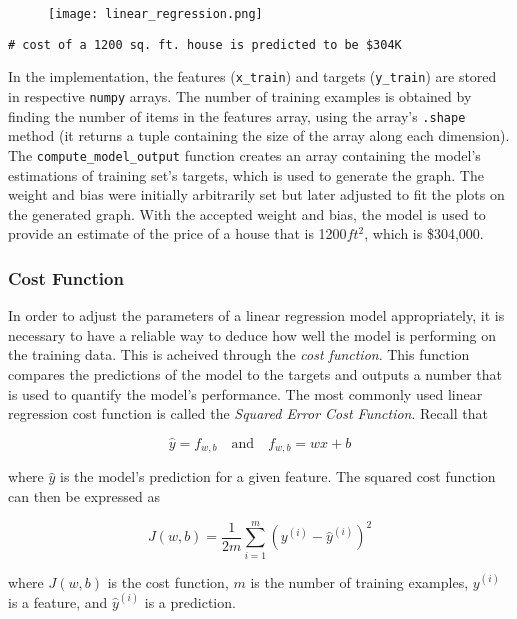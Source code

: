 \documentclass{article}
\begin{document}
\begin{figure}
\centering
\texttt{[image: linear\_regression.png]}
\end{figure}

\begin{lstlisting}[caption={Code Output}]
# cost of a 1200 sq. ft. house is predicted to be $304K
\end{lstlisting}

\noindent In the implementation, the features (\texttt{x\_train}) and targets (\texttt{y\_train}) are stored in respective \texttt{numpy} arrays. The number of training examples is obtained by finding the number of items in the features array, using the array's \texttt{.shape} method (it returns a tuple containing the size of the array along each dimension). The \texttt{compute\_model\_output} function creates an array containing the model's estimations of training set's targets, which is used to generate the graph. The weight and bias were initially arbitrarily set but later adjusted to fit the plots on the generated graph. With the accepted weight and bias, the model is used to provide an estimate of the price of a house that is 1200$ft^2$, which is \$304,000.

\subsubsection{Cost Function}
In order to adjust the parameters of a linear regression model appropriately, it is necessary to have a reliable way to deduce how well the model is performing on the training data. This is acheived through the \textit{cost function}. This function compares the predictions of the model to the targets and outputs a number that is used to quantify the model's performance. The most commonly used linear regression cost function is called the \textit{Squared Error Cost Function}. Recall that

\[
	\hat{y} =  f_{w, b} \quad \textrm{and} \quad f_{w, b} = wx + b
\]

\noindent where $\hat{y}$ is the model's prediction for a given feature. The squared cost function can then be expressed as

\[ J(w, b) = \frac{1}{2m}\sum^{m}_{i = 1}{ ({ y^{(i)} - \hat{y}^{(i)} })^2 }\]

\noindent where $J(w, b)$ is the cost function, $m$ is the number of training examples, $y^{(i)}$ is a feature, and $\hat{y}^{(i)}$ is a prediction.
\end{document}

